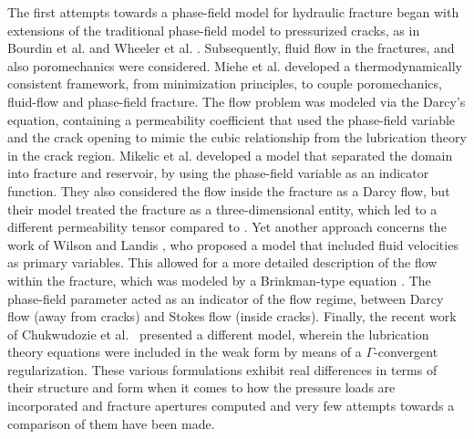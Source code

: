     The first attempts towards a phase-field model for hydraulic fracture began with extensions of the traditional phase-field model to pressurized cracks, as in Bourdin et al. \cite{bourdin2012variational} and Wheeler et al. \cite{wheeler2014augmented}. Subsequently, fluid flow in the fractures, and also poromechanics were considered. Miehe et al. \cite{miehe2015minimization, miehe2016phase} developed a thermodynamically consistent framework, from minimization principles, to couple poromechanics, fluid-flow and phase-field fracture. The flow problem was modeled via the Darcy's equation, containing a permeability coefficient that used the phase-field variable and the crack opening to mimic the cubic relationship from the lubrication theory in the crack region. Mikelic et al. \cite{mikelic2015phase1, mikelic2015phase2} developed a model that separated the domain into fracture and reservoir, by using the phase-field variable as an indicator function. They also considered the flow inside the fracture as a Darcy flow, but their model treated the fracture as a three-dimensional entity, which led to a different permeability tensor compared to \cite{miehe2015minimization, miehe2016phase}.  Yet another approach concerns the work of Wilson and Landis \cite{wilson2016phase}, who proposed a model that included fluid velocities as primary variables. This allowed for a more detailed description of the flow within the fracture, which was modeled by a Brinkman-type equation \cite{brinkman1949calculation}. The phase-field parameter acted as an indicator of the flow regime, between Darcy flow (away from cracks) and Stokes flow (inside cracks).  Finally, the recent work of Chukwudozie et al.\ \cite{chukwudozie2019variational} presented a different model, wherein the lubrication theory equations were included in the weak form by means of a $\Gamma$-convergent regularization. These various formulations exhibit real differences in terms of their structure and form when it comes to how the pressure loads are incorporated and fracture apertures computed and very few attempts towards a comparison of them have been made.

